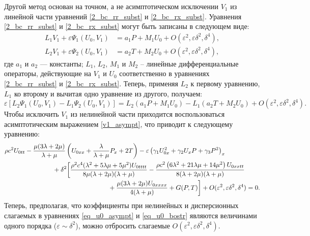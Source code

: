 \documentclass[12pt, a4paper]{article}
\newcommand{\lb}{\left (}
\newcommand{\rb}{\right )}
\begin{document}
Другой метод основан на точном, а не асимптотическом исключении $V_1$ из линейной части уравнений \eqref{2_bc_rr_subst} и \eqref{2_bc_rx_subst}.
Уравнения \eqref{2_bc_rr_subst} и \eqref{2_bc_rx_subst} могут быть записаны в следующем виде:
\begin{align}%
L_{1} V_1 + \varepsilon\Psi_1(U_0, V_1) &= a_1 P + M_1 U_0 + O(\varepsilon^2, \varepsilon\delta^2, \delta^4),\\
L_{2} V_1 + \varepsilon\Psi_2(U_0, V_1) &= a_2 T + M_2 U_0 + O(\varepsilon^2, \varepsilon\delta^2, \delta^4),
\end{align}
где $a_1$ и $a_2$ --- константы; $L_{1}$, $L_{2}$, $M_{1}$ и $M_{2}$ -- линейные дифференциальные операторы, действующие на $V_1$ и $U_0$ соответственно в уравнениях \eqref{2_bc_rr_subst} и \eqref{2_bc_rx_subst}. Теперь, применяя $L_{2}$ к первому уравнению, $L_{1}$ ко второму и вычитая одно уравнение из другого, получаем:
\begin{equation}
\varepsilon [L_{2}\Psi_1(U_0, V_1) - L_{1}\Psi_2(U_0, V_1)] =  L_{2}\lb a_1 P + M_1 U_0\rb - L_{1}\lb a_2 T + M_2 U_0\rb + O(\varepsilon^2, \varepsilon\delta^2, \delta^4).
\end{equation}
Чтобы исключить $V_1$ из нелинейной части приходится воспользоваться асимптотическим выражением \eqref{v1_asympt}, что приводит к следующему уравнению:
\begin{equation} \label{eq_u0_bostr}
\begin{split}
\rho c^2 U_{0tt} &- \frac{\mu(3\lambda + 2\mu)}{\lambda + \mu} \left(U_{0xx} + \frac{\lambda}{\lambda + \mu} P_x + 2T\right)
- \varepsilon \left(\gamma_1 U_{0x}^2 + \gamma_2 U_x P + \gamma_3 P^2 \right)_x \\
&\hspace{15mm}+ \delta^2 \bigg[\frac{\rho ^2 c^4 (\lambda^2 + 5\lambda\mu + 5\mu^2) U_{0tttt}}{8\mu(\lambda+2\mu)(\lambda+\mu)} - \frac{\rho c^2 \left(6\lambda^2 + 21\lambda \mu + 14\mu^2\right) U_{0xxtt}}{8(\lambda + 2\mu)(\lambda + \mu)} \\
&\hspace{45mm} + \frac{\mu(3\lambda + 2\mu) U_{0xxxx}}{4(\lambda + \mu)} + G(P, T)\bigg] + O(\varepsilon^2, \varepsilon\delta^2, \delta^4) = 0.
\end{split} 
\end{equation}
Теперь, предполагая, что коэффициенты при нелинейных и дисперсионных слагаемых в уравнениях \eqref{eq_u0_asympt} и \eqref{eq_u0_bostr} являются величинами одного порядка ($ \varepsilon \sim \delta^2 $), можно отбросить слагаемые $O(\varepsilon^2, \varepsilon\delta^2, \delta^4)$. 
\end{document}
